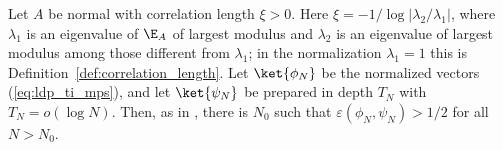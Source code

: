 \begin{theorem}
    \label{thm:ldp_depth_lower_bound}
    \leanok
    Let $A$ be normal with correlation length $\xi>0$. Here
    $\xi=-1/\log\lvert\lambda_2/\lambda_1\rvert$, where $\lambda_1$ is an
    eigenvalue of $\E_A$ of largest modulus and $\lambda_2$ is an eigenvalue of
    largest modulus among those different from $\lambda_1$; in the normalization
    $\lambda_1=1$ this is Definition~\ref{def:correlation_length}. Let
    $\ket{\phi_N}$ be the normalized vectors (\ref{eq:ldp_ti_mps}), and let
    $\ket{\psi_N}$ be prepared in depth $T_N$ with $T_N=o(\log N)$. Then, as in
    \cite[Theorem~1]{Malz2024Preparation}, there is $N_0$ such that
    $\varepsilon(\phi_N,\psi_N)>1/2$ for all $N>N_0$.
\end{theorem}
